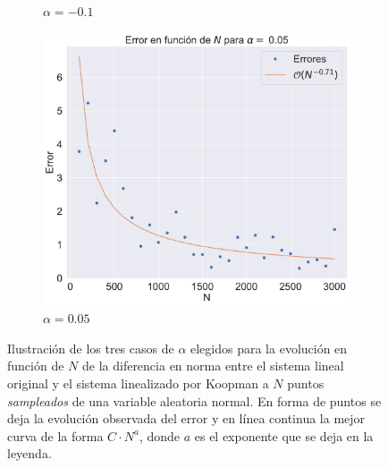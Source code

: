 \begin{figure}[h]
\begin{subfigure}[b]{0.32\textwidth}
        \caption{$\alpha=-0.1$}
        \label{fig:image2}
    \end{subfigure}
    \hfill
    \begin{subfigure}[b]{0.32\textwidth}
        \centering
        \includegraphics[width=\textwidth]{img/content/chapter3/Linear3Errors.pdf}
        \caption{$\alpha=0.05$}
        \label{fig:image3}
    \end{subfigure}
    \caption{Ilustración de los tres casos de $\alpha$ elegidos para la evolución en función de $N$ de la diferencia en norma entre el sistema lineal original y el sistema linealizado por Koopman a $N$ puntos \textit{sampleados} de una variable aleatoria normal. En forma de puntos se deja la evolución observada del error y en línea continua la mejor curva de la forma $C \cdot N^{a}$, donde $a$ es el exponente que se deja en la leyenda.}
    \label{fig:ErrorLin}
\end{figure}
